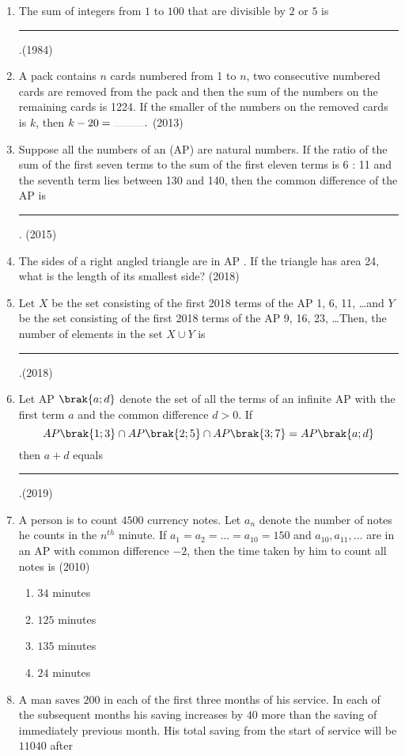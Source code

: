 \begin{enumerate}    [label=\thesubsection.\arabic*, ref=\thesubsection.\theenumi]
%
\item  The sum of integers from $1$ to $100$ that are divisible by $2$ or $5$ is \rule{1cm}{0.1pt}.\hfill{(1984)}
%
   \item A pack contains $n$ cards numbered from 1 to $n$,  two consecutive numbered cards are removed from the pack and then the sum of the numbers on the remaining cards is 1224. If the smaller of the numbers on the removed cards is $k$,  then $k - 20=\rule{1cm}{0.1pt}.$ \hfill(2013)
   \item Suppose all the numbers of an (AP) are natural numbers. If the ratio of the sum of the first seven terms to the sum of the first eleven terms is 6 : 11 and the seventh term lies between 130 and 140,  then the common difference of the AP is \rule{1cm}{0.1pt}.
    \hfill(2015)
%
   \item The sides of a right angled triangle are in  AP . If the triangle has area 24,  what is the length of its smallest side? 
%   
   \hfill(2018)
%
   \item Let $X$ be the set consisting of the first 2018 terms of the  AP  1,  6,  11,  \dots  and $Y$ be the set consisting of the first 2018 terms of the  AP  9,  16,  23,  \dots Then,  the number of elements in the set $ X \cup Y $ is \rule{1cm}{0.1pt}.\hfill(2018)
   \item Let AP $\brak{a; d}$ denote the set of all the terms of an infinite  AP  with the first term $a$ and the common difference $d>0$. If $$AP\brak{1; 3}\cap AP\brak{2; 5}\cap AP\brak{3; 7} = AP\brak{a; d}$$ then $a + d$ equals \rule{1cm}{0.1pt}.\hfill(2019)
%   
    \item  A person is to count $4500$ currency notes. Let $a_n$ denote the number of notes he counts in the $n^{th}$ minute. If $a_1=a_2=\dots=a_{10}=150$ and $a_{10}, a_{11}, \dots$ are in an AP with common difference $-2$,  then the time taken by him to count all notes is   
%     
    \hfill(2010)
%    
    \begin{multicols}{4}
\begin{enumerate}    
    \item$34$ minutes
    \item$125$ minutes
    \item$135$ minutes
    \item$24$ minutes 
    \end{enumerate}
\end{multicols}
%
    \item A man saves \rupee$200$ in each of the first three months of his service. In each of the subsequent months his saving increases by \rupee$40$ more than the saving of immediately previous month. His total saving from the start of service will be \rupee$11040$ after    

\end{enumerate}
